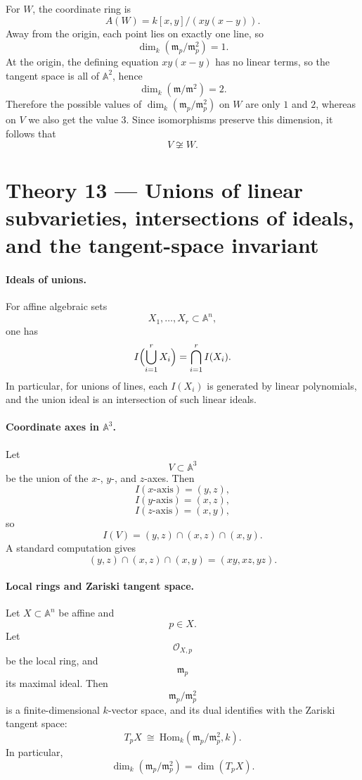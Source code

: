 \documentclass[12pt,a4paper]{article}
\theoremstyle{plain}
\theoremstyle{definition}      %
\begin{document}
For $W$, the coordinate ring is
\[
A(W)=k[x,y]/(xy(x-y)).
\]
Away from the origin, each point lies on exactly one line, so
\[
\dim_k(\mathfrak m_p/\mathfrak m_p^2)=1.
\]
At the origin, the defining equation $xy(x-y)$ has no linear terms, so the tangent space is all of $\mathbb A^2$, hence
\[
\dim_k(\mathfrak m/\mathfrak m^2)=2.
\]
Therefore the possible values of $\dim_k(\mathfrak m_p/\mathfrak m_p^2)$ on $W$ are only $1$ and $2$,
whereas on $V$ we also get the value $3$.
Since isomorphisms preserve this dimension, it follows that
\[
V\not\cong W.
\]






\section*{Theory 13 — Unions of linear subvarieties, intersections of ideals, and the tangent-space invariant}

\paragraph{Ideals of unions.}
For affine algebraic sets
\[
X_1,\dots,X_r \subset \mathbb{A}^n,
\]
one has
\[
I\Bigl(\bigcup_{i=1}^r X_i\Bigr)
=
\bigcap_{i=1}^r I(X_i).
\]
In particular, for unions of lines, each $I(X_i)$ is generated by linear polynomials, and the union ideal is an intersection of such linear ideals.

\paragraph{Coordinate axes in $\mathbb{A}^3$.}
Let
\[
V \subset \mathbb{A}^3
\]
be the union of the $x$-, $y$-, and $z$-axes.
Then
\[
I(\text{$x$-axis})=(y,z),
\]
\[
I(\text{$y$-axis})=(x,z),
\]
\[
I(\text{$z$-axis})=(x,y),
\]
so
\[
I(V)=(y,z)\cap(x,z)\cap(x,y).
\]
A standard computation gives
\[
(y,z)\cap(x,z)\cap(x,y)
=
(xy,xz,yz).
\]

\paragraph{Local rings and Zariski tangent space.}
Let $X\subset \mathbb{A}^n$ be affine and
\[
p\in X.
\]
Let
\[
\mathcal{O}_{X,p}
\]
be the local ring, and
\[
\mathfrak m_p
\]
its maximal ideal.
Then
\[
\mathfrak m_p/\mathfrak m_p^2
\]
is a finite-dimensional $k$-vector space, and its dual identifies with the Zariski tangent space:
\[
T_pX
\ \cong\
\mathrm{Hom}_k(\mathfrak m_p/\mathfrak m_p^2,k).
\]
In particular,
\[
\dim_k(\mathfrak m_p/\mathfrak m_p^2)=\dim(T_pX).
\]
\end{document}
